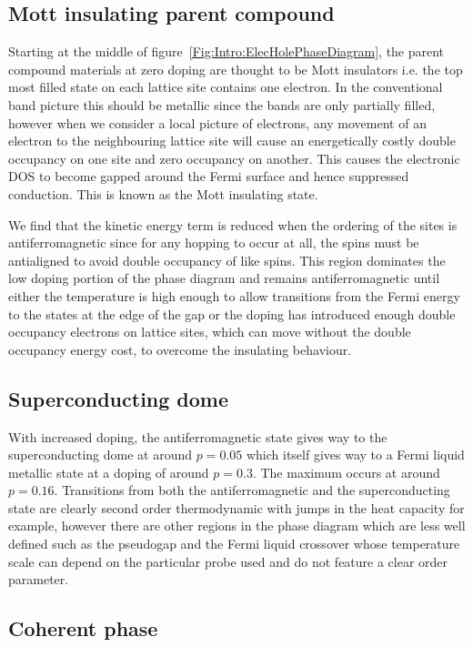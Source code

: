 \subsection{Mott insulating parent compound}

Starting at the middle of figure~\ref{Fig:Intro:ElecHolePhaseDiagram}, the parent compound materials at zero doping are thought to be Mott insulators i.e. the top most filled state on each lattice site contains one electron. In the conventional band picture this should be metallic since the bands are only partially filled, however when we consider a local picture of electrons, any movement of an electron to the neighbouring lattice site will cause an energetically costly double occupancy on one site and zero occupancy on another. This causes the electronic \ac{DOS} to become gapped around the Fermi surface and hence suppressed conduction. This is known as the Mott insulating state.

We find that the kinetic energy term is reduced when the ordering of the sites is antiferromagnetic since for any hopping to occur at all, the spins must be antialigned to avoid double occupancy of like spins. This region dominates the low doping portion of the phase diagram and remains antiferromagnetic until either the temperature is high enough to allow transitions from the Fermi energy to the states at the edge of the gap or the doping has introduced enough double occupancy electrons on lattice sites, which can move without the double occupancy energy cost, to overcome the insulating behaviour.

\subsection{Superconducting dome}

With increased doping, the antiferromagnetic state gives way to the superconducting dome at around $p=0.05$ which itself gives way to a Fermi liquid metallic state at a doping of around $p=0.3$. The maximum \Tc occurs at around $p=0.16$. Transitions from both the antiferromagnetic and the superconducting state are clearly second order thermodynamic with jumps in the heat capacity for example, however there are other regions in the phase diagram which are less well defined such as the pseudogap and the Fermi liquid crossover whose temperature scale can depend on the particular probe used and do not feature a clear order parameter.

\subsection{Coherent phase}

